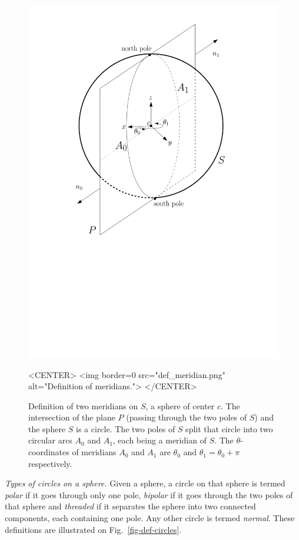 \begin{figure}[ht!]
  \begin{ccTexOnly}
  \centerline{ \includegraphics[height=.5\textwidth]{Circular_kernel_3/def_meridian} }
  \end{ccTexOnly}

  \begin{ccHtmlOnly}
    <CENTER>
      <img border=0 src="def_meridian.png" alt="Definition of meridians.">
    </CENTER>
  \end{ccHtmlOnly}

  \caption{Definition of two meridians on $S$, a sphere of center $c$.
  The intersection of the plane $P$ (passing through the two poles of $S$)
  and the sphere $S$ is a circle. The two poles of $S$ split that circle into two circular arcs $A_0$ and $A_1$, each being a meridian of $S$. 
  The $\theta$-coordinates of meridians $A_0$ and $A_1$ are $\theta_0$ and $\theta_1= \theta_0 + \pi$ respectively.
  }
  \label{fig-def-meridian}
\end{figure}


\textit{Types of circles on a sphere.}
Given a sphere, a circle on that sphere is termed
\textit{polar} if it goes through only one pole, \textit{bipolar} if
it goes through the two poles of that sphere and \textit{threaded} if
it separates the sphere into two connected components, each
containing one pole. Any other circle is termed \textit{normal}. These
definitions are illustrated on Fig.~\ref{fig-def-circles}.


